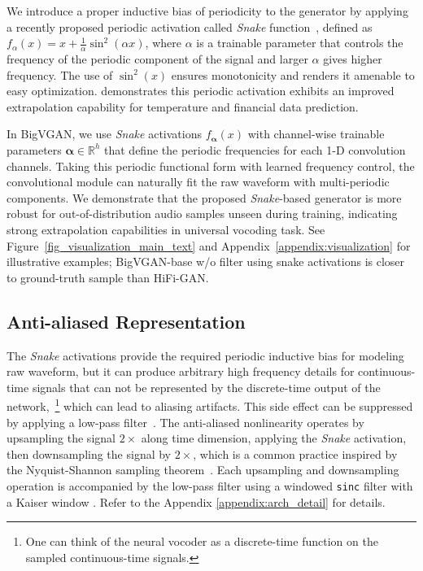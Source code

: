\documentclass{article} \usepackage{iclr2023_conference,times}
\theoremstyle{plain}
\theoremstyle{definition}
\theoremstyle{remark}
\newcommand{\vv}[1]{\boldsymbol{#1}}
\begin{document}
We introduce a proper inductive bias of periodicity to the generator by applying a recently proposed periodic activation called \emph{Snake} function~\citep{liu2020neural}, defined as $f_{\alpha}(x) = x + \frac{1}{\alpha} \sin^2(\alpha x)$, where $\alpha$ is a trainable parameter that controls the frequency of the periodic component of the signal and larger $\alpha$ gives higher frequency. The use of $\sin^2(x)$ ensures monotonicity and renders it amenable to easy optimization. 
\citet{liu2020neural} demonstrates this periodic activation exhibits an improved extrapolation capability for temperature and financial data prediction.

In BigVGAN, we use \emph{Snake} activations $f_{\vv\alpha}(x)$ with channel-wise trainable parameters $\vv\alpha\in\mathbb{R}^h$ that define the periodic frequencies for each 1-D convolution channels.
Taking this periodic functional form with learned frequency control, the convolutional module can naturally fit the raw waveform with multi-periodic components.
We demonstrate that the proposed \emph{Snake}-based generator is more robust for out-of-distribution audio samples unseen during training, indicating strong extrapolation capabilities in universal vocoding task.
See Figure~\ref{fig_visualization_main_text} and Appendix~\ref{appendix:visualization} for illustrative examples; BigVGAN-base w/o filter using snake activations is closer to ground-truth sample than HiFi-GAN.

\vspace{-.2cm}
\subsection{Anti-aliased Representation}
\vspace{-.2cm}


The \emph{Snake} activations provide the required periodic inductive bias for modeling raw waveform, but it can produce arbitrary high frequency details for continuous-time signals that can not be represented by the discrete-time output of the network,~\footnote{One can think of the neural vocoder as a discrete-time function on the sampled continuous-time signals.} which can lead to aliasing artifacts.
This side effect can be suppressed by applying a low-pass filter~\citep[e.g.,][]{karras2021alias}. The anti-aliased nonlinearity operates by upsampling the signal $2\times$ along time dimension, applying the \emph{Snake} activation, then downsampling the signal by $2\times$, which is a common practice inspired by the Nyquist-Shannon sampling theorem~\citep{shannon1949communication}. Each upsampling and downsampling operation is accompanied by the low-pass filter using a windowed \texttt{sinc} filter with a Kaiser window \citep{dsp}. Refer to the Appendix \ref{appendix:arch_detail} for details.
\end{document}
